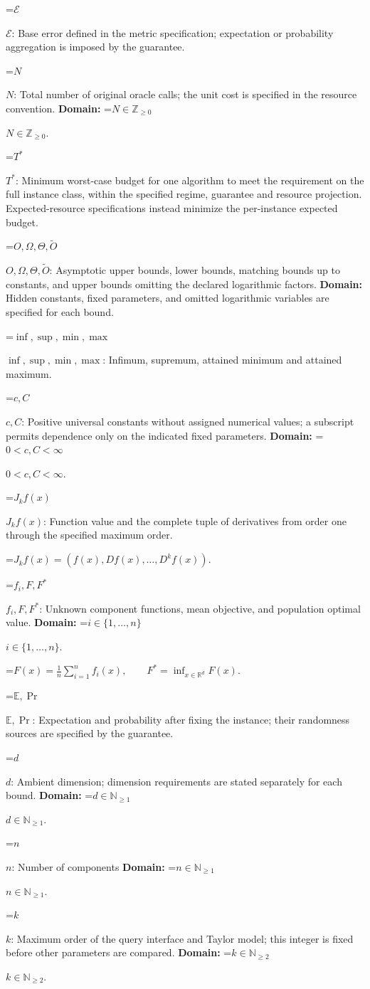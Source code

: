 \documentclass[10pt,a4paper]{article}
\newcommand{\AtlasMath}[1]{\par\begingroup\centering\setbox0=\hbox{$\displaystyle #1$}\ifdim\wd0>1.4\linewidth\typeout{ATLAS WIDE FORMULA: \the\wd0}\fi\ifdim\wd0>\linewidth\resizebox{\linewidth}{!}{\box0}\else\box0\fi\par\endgroup}
\newcommand{\AtlasInlineMath}[1]{\begingroup\setbox0=\hbox{$#1$}\ifdim\wd0>.4\linewidth\endgroup\AtlasMath{#1}\else\endgroup$#1$\fi}
\begin{document}
\AtlasInlineMath{\mathcal{E}}: Base error defined in the metric specification; expectation or probability aggregation is imposed by the guarantee.

\AtlasInlineMath{N}: Total number of original oracle calls; the unit cost is specified in the resource convention. \textbf{Domain:} \AtlasInlineMath{N\in\mathbb{Z}_{\ge0}}.

\AtlasInlineMath{T^*}: Minimum worst-case budget for one algorithm to meet the requirement on the full instance class, within the specified regime, guarantee and resource projection. Expected-resource specifications instead minimize the per-instance expected budget.

\AtlasInlineMath{O,\Omega,\Theta,\widetilde{O}}: Asymptotic upper bounds, lower bounds, matching bounds up to constants, and upper bounds omitting the declared logarithmic factors. \textbf{Domain:} Hidden constants, fixed parameters, and omitted logarithmic variables are specified for each bound.

\AtlasInlineMath{\inf,\sup,\min,\max}: Infimum, supremum, attained minimum and attained maximum.

\AtlasInlineMath{c,C}: Positive universal constants without assigned numerical values; a subscript permits dependence only on the indicated fixed parameters. \textbf{Domain:} \AtlasInlineMath{0<c,C<\infty}.

\AtlasInlineMath{J_{k}f(x)}: Function value and the complete tuple of derivatives from order one through the specified maximum order.


\AtlasMath{J_{k}f(x)=(f(x),Df(x),\ldots,D^{k}f(x)).}


\AtlasInlineMath{f_i,F,F^*}: Unknown component functions, mean objective, and population optimal value. \textbf{Domain:} \AtlasInlineMath{i\in\{1,\ldots,n\}}.


\AtlasMath{F(x)=\frac1n\sum_{i=1}^nf_i(x),\qquad F^*=\inf_{x\in\mathbb{R}^d}F(x).}


\AtlasInlineMath{\mathbb{E},\Pr}: Expectation and probability after fixing the instance; their randomness sources are specified by the guarantee.

\AtlasInlineMath{d}: Ambient dimension; dimension requirements are stated separately for each bound. \textbf{Domain:} \AtlasInlineMath{d\in\mathbb{N}_{\ge 1}}.

\AtlasInlineMath{n}: Number of components \textbf{Domain:} \AtlasInlineMath{n\in\mathbb{N}_{\ge 1}}.

\AtlasInlineMath{k}: Maximum order of the query interface and Taylor model; this integer is fixed before other parameters are compared. \textbf{Domain:} \AtlasInlineMath{k\in\mathbb{N}_{\ge 2}}.
\end{document}
